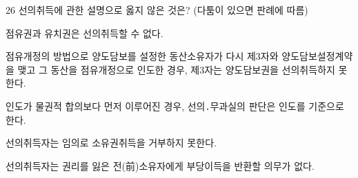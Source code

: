 \begin{question}{26}
선의취득에 관한 설명으로 옳지 않은 것은? (다툼이 있으면 판례에 따름)
\begin{choices}
  \item 점유권과 유치권은 선의취득할 수 없다.
  \item 점유개정의 방법으로 양도담보를 설정한 동산소유자가 다시 제3자와 양도담보설정계약을 맺고 그 동산을 점유개정으로 인도한 경우, 제3자는 양도담보권을 선의취득하지 못한다.
  \item 인도가 물권적 합의보다 먼저 이루어진 경우, 선의․무과실의 판단은 인도를 기준으로 한다.
  \item 선의취득자는 임의로 소유권취득을 거부하지 못한다.
  \item 선의취득자는 권리를 잃은 전(前)소유자에게 부당이득을 반환할 의무가 없다.
\end{choices}
\end{question}
